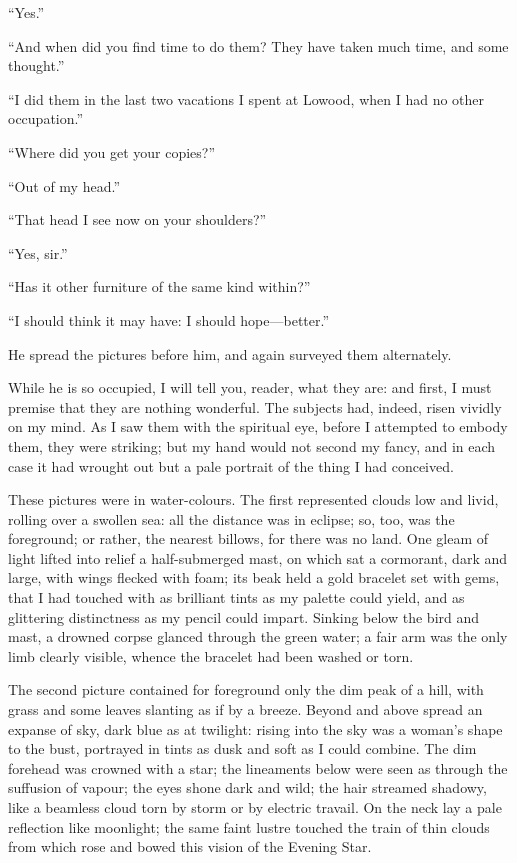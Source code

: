 \enquote{Yes.}

\enquote{And when did you find time to do them? They have taken much
time, and some thought.}

\enquote{I did them in the last two vacations I spent at Lowood, when I
had no other occupation.}

\enquote{Where did you get your copies?}

\enquote{Out of my head.}

\enquote{That head I see now on your shoulders?}

\enquote{Yes, sir.}

\enquote{Has it other furniture of the same kind within?}

\enquote{I should think it may have: I should hope---better.}

He spread the pictures before him, and again surveyed them alternately.

While he is so occupied, I will tell you, reader, what they are: and
first, I must premise that they are nothing wonderful. The subjects
had, indeed, risen vividly on my mind. As I saw them with the spiritual
eye, before I attempted to embody them, they were striking; but my hand
would not second my fancy, and in each case it had wrought out but a
pale portrait of the thing I had conceived.

These pictures were in water-colours. The first represented clouds low
and livid, rolling over a swollen sea: all the distance was in eclipse;
so, too, was the foreground; or rather, the nearest billows, for there
was no land. One gleam of light lifted into relief a half-submerged
mast, on which sat a cormorant, dark and large, with wings flecked with
foam; its beak held a gold bracelet set with gems, that I had touched
with as brilliant tints as my palette could yield, and as glittering
distinctness as my pencil could impart. Sinking below the bird and
mast, a drowned corpse glanced through the green water; a fair arm was
the only limb clearly visible, whence the bracelet had been washed or
torn.

The second picture contained for foreground only the dim peak of a hill,
with grass and some leaves slanting as if by a breeze. Beyond and above
spread an expanse of sky, dark blue as at twilight: rising into the sky
was a woman's shape to the bust, portrayed in tints as dusk and soft as
I could combine. The dim forehead was crowned with a star; the
lineaments below were seen as through the suffusion of vapour; the eyes
shone dark and wild; the hair streamed shadowy, like a beamless cloud
torn by storm or by electric travail. On the neck lay a pale reflection
like moonlight; the same faint lustre touched the train of thin clouds
from which rose and bowed this vision of the Evening Star.

